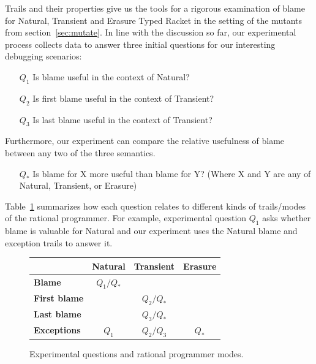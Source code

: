 Trails and their properties give us the tools for a rigorous examination
of blame for Natural, Transient and Erasure Typed Racket in the setting of the 
mutants from section~\ref{sec:mutate}. In line with the discussion so far, 
our experimental process collects data to answer three initial questions
for our interesting debugging scenarios:
\begin{itemize}
\item[$Q_1$] Is blame useful in the context of Natural?

\item[$Q_2$] Is first blame useful in the context of Transient?

\item[$Q_3$] Is last blame useful in the context of Transient?

\end{itemize}

Furthermore, our experiment can compare the relative usefulness of blame
between any two of the three semantics. 
\begin{itemize}
\item[$Q_*$] Is blame for X more useful than blame for Y? (Where X and Y are any of Natural, Transient, or Erasure)
\end{itemize}


Table~\ref{fig:experiment-outline} summarizes how each question relates to
different kinds of trails/modes of the rational programmer. For example, experimental
question $Q_1$ asks whether blame is valuable for Natural and our experiment
uses the Natural blame and exception trails to answer it.

\begin{figure}[ht]
\center
{\begin{tabular}{l|c|c|c}
                        & {\bf Natural}  & {\bf Transient} &  {\bf Erasure} \\ \hline 
{\bf Blame}             &  $Q_1/Q_*$    &                  &                \\
{\bf First blame}       &               &     $Q_2/Q_*$    &                 \\
{\bf Last blame}        &               &     $Q_3/Q_*$    &                 \\
{\bf Exceptions}        &      $Q_1$    &     $Q_2/Q_3$    &      $Q_*$      \\
\end{tabular}}
  \caption{ Experimental questions and rational programmer modes.}
  \label{fig:experiment-outline}
\end{figure}

